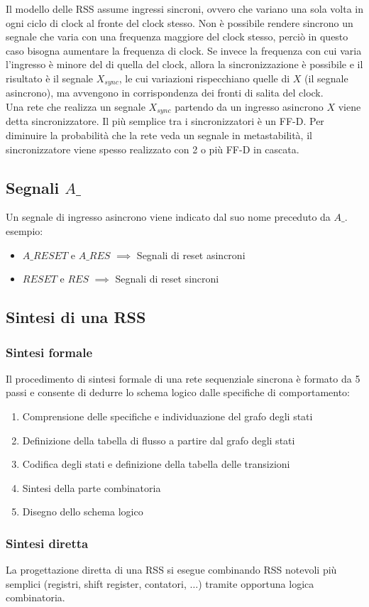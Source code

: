 \documentclass{article}
\begin{document}
Il modello delle RSS assume ingressi sincroni, ovvero che variano una sola volta in ogni ciclo di clock al fronte del clock stesso.
Non è possibile rendere sincrono un segnale che varia con una frequenza maggiore del clock stesso, perciò in questo caso bisogna aumentare la frequenza di clock.
Se invece la frequenza con cui varia l'ingresso è minore del di quella del clock, allora la sincronizzazione è possibile e il risultato è il segnale $X_{sync}$, le cui variazioni rispecchiano quelle di $X$ (il segnale asincrono), ma avvengono in corrispondenza dei fronti di salita del clock.\\

\noindent
Una rete che realizza un segnale $X_{sync}$ partendo da un ingresso asincrono $X$ viene detta sincronizzatore.
Il più semplice tra i sincronizzatori è un FF-D.
Per diminuire la probabilità che la rete veda un segnale in metastabilità, il sincronizzatore viene spesso realizzato con 2 o più FF-D in cascata.

\subsection{Segnali $A\_$}

Un segnale di ingresso asincrono viene indicato dal suo nome preceduto da $A\_$.\\

\noindent
esempio:

\begin{itemize}
    \item $A\_RESET$ e $A\_RES$ $\implies$ Segnali di reset asincroni
    \item $RESET$ e $RES$ $\implies$ Segnali di reset sincroni
\end{itemize}

\subsection{Sintesi di una RSS}

\subsubsection{Sintesi formale}

Il procedimento di sintesi formale di una rete sequenziale sincrona è formato da 5 passi e consente di dedurre lo schema logico dalle specifiche di comportamento:

\begin{enumerate}
    \item Comprensione delle specifiche e individuazione del grafo degli stati
    \item Definizione della tabella di flusso a partire dal grafo degli stati
    \item Codifica degli stati e definizione della tabella delle transizioni
    \item Sintesi della parte combinatoria
    \item Disegno dello schema logico
\end{enumerate}

\subsubsection{Sintesi diretta}

La progettazione diretta di una RSS si esegue combinando RSS notevoli più semplici (registri, shift register, contatori, $\dots$) tramite opportuna logica combinatoria.
\end{document}
